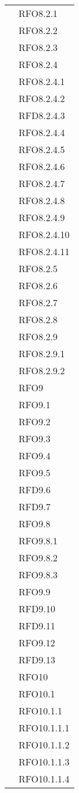 \begin{longtable}{ p{12cm} | p{4cm} }
			& RFO8.2.1 \\
			& RFO8.2.2 \\
			& RFO8.2.3 \\
			& RFO8.2.4 \\
			& RFO8.2.4.1 \\
			& RFO8.2.4.2 \\
			& RFD8.2.4.3 \\
			& RFO8.2.4.4 \\
			& RFO8.2.4.5 \\
			& RFO8.2.4.6 \\
			& RFO8.2.4.7 \\
			& RFO8.2.4.8 \\
			& RFO8.2.4.9 \\
			& RFO8.2.4.10 \\
			& RFO8.2.4.11 \\
			& RFO8.2.5 \\
			& RFO8.2.6 \\
			& RFO8.2.7 \\
			& RFO8.2.8 \\
			& RFO8.2.9 \\
			& RFO8.2.9.1 \\
			& RFO8.2.9.2 \\
			& RFO9 \\
			& RFO9.1 \\
			& RFO9.2 \\
			& RFO9.3 \\
			& RFO9.4 \\
			& RFO9.5 \\
			& RFD9.6 \\
			& RFD9.7 \\
			& RFO9.8 \\
			& RFO9.8.1 \\
			& RFO9.8.2 \\
			& RFO9.8.3 \\
			& RFO9.9 \\
			& RFD9.10 \\
			& RFD9.11 \\
			& RFO9.12 \\
			& RFD9.13 \\
			& RFO10 \\
			& RFO10.1 \\
			& RFO10.1.1 \\
			& RFO10.1.1.1 \\
			& RFO10.1.1.2 \\
			& RFO10.1.1.3 \\
			& RFO10.1.1.4 \\

\end{longtable}
